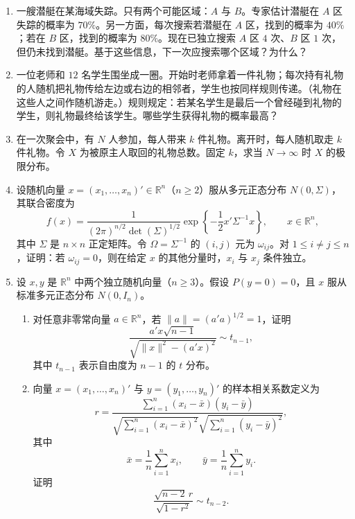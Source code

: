 \documentclass[UTF8,12pt]{ctexart}
\begin{document}
\begin{enumerate}[label=\textbf{\arabic*.},leftmargin=2.2em]
\item 一艘潜艇在某海域失踪。只有两个可能区域：\(A\) 与 \(B\)。专家估计潜艇在 \(A\) 区失踪的概率为 \(70\%\)。另一方面，每次搜索若潜艇在 \(A\) 区，找到的概率为 \(40\%\)；若在 \(B\) 区，找到的概率为 \(80\%\)。现在已独立搜索 \(A\) 区 \(4\) 次、\(B\) 区 \(1\) 次，但仍未找到潜艇。基于这些信息，下一次应搜索哪个区域？为什么？

\item 一位老师和 \(12\) 名学生围坐成一圈。开始时老师拿着一件礼物；每次持有礼物的人随机把礼物传给左边或右边的相邻者，学生也按同样规则传递。（礼物在这些人之间作随机游走。）规则规定：若某名学生是最后一个曾经碰到礼物的学生，则礼物最终给该学生。哪些学生获得礼物的概率最高？

\item 在一次聚会中，有 \(N\) 人参加，每人带来 \(k\) 件礼物。离开时，每人随机取走 \(k\) 件礼物。令 \(X\) 为被原主人取回的礼物总数。固定 \(k\)，求当 \(N\to\infty\) 时 \(X\) 的极限分布。

\item 设随机向量 \(x=(x_1,\ldots,x_n)'\in\mathbb R^n\)（\(n\ge2\)）服从多元正态分布 \(N(0,\Sigma)\)，其联合密度为
\[
f(x)=\frac{1}{(2\pi)^{n/2}\det(\Sigma)^{1/2}}
\exp\left\{-\frac12x'\Sigma^{-1}x\right\},\qquad x\in\mathbb R^n,
\]
其中 \(\Sigma\) 是 \(n\times n\) 正定矩阵。令 \(\Omega=\Sigma^{-1}\) 的 \((i,j)\) 元为 \(\omega_{ij}\)。对 \(1\le i\ne j\le n\)，证明：若 \(\omega_{ij}=0\)，则在给定 \(x\) 的其他分量时，\(x_i\) 与 \(x_j\) 条件独立。

\item 设 \(x,y\) 是 \(\mathbb R^n\) 中两个独立随机向量（\(n\ge3\)）。假设 \(P(y=0)=0\)，且 \(x\) 服从标准多元正态分布 \(N(0,I_n)\)。
\begin{enumerate}[label=\textbf{(\alph*)},leftmargin=2.4em]
\item 对任意非零常向量 \(a\in\mathbb R^n\)，若 \(\|a\|=(a'a)^{1/2}=1\)，证明
\[
\frac{a'x\sqrt{n-1}}{\sqrt{\|x\|^2-(a'x)^2}}\sim t_{n-1},
\]
其中 \(t_{n-1}\) 表示自由度为 \(n-1\) 的 \(t\) 分布。
\item 向量 \(x=(x_1,\ldots,x_n)'\) 与 \(y=(y_1,\ldots,y_n)'\) 的样本相关系数定义为
\[
r=\frac{\sum_{i=1}^n(x_i-\bar x)(y_i-\bar y)}
{\sqrt{\sum_{i=1}^n(x_i-\bar x)^2}\sqrt{\sum_{i=1}^n(y_i-\bar y)^2}},
\]
其中
\[
\bar x=\frac1n\sum_{i=1}^n x_i,\qquad
\bar y=\frac1n\sum_{i=1}^n y_i.
\]
证明
\[
\frac{\sqrt{n-2}\,r}{\sqrt{1-r^2}}\sim t_{n-2}.
\]
\end{enumerate}
\end{enumerate}
\end{document}
